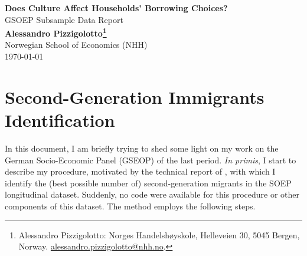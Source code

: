 \documentclass[12pt,a4paper]{article}
\makeatletter
\def\thanks#1{\footnote{#1}}
\newcommand{\Title}{Does Culture Affect Households' Borrowing Choices?}%
\newcommand{\wDocument}{GSOEP Subsample Data Report}%
\newcommand{\Name}{Alessandro Pizzigolotto}%
\newcommand{\AffiliationA}{Norwegian School of Economics (NHH)}%
\newcommand{\Address}{Norges Handelshøyskole, Helleveien 30, 5045 Bergen, Norway}%
\newcommand{\Email}{\href{mailto:alessandro.pizzigolotto@nhh.no}{alessandro.pizzigolotto@nhh.no}}%
\newcommand{\mydate}{\today}
\makeatother
\begin{document}

\begin{center}
    {\Large \bf {\textup{\Title}}}\\
    \vspace{0.2in}
    {\large \sc \wDocument}\\
    \vspace{0.2in}
    {\bf {\Name}\thanks{\Name: \Address. \Email.}}\\
    \AffiliationA\\
    \vspace{0.3in}
    \mydate %
    \vspace{0.3in}
\end{center}

\section{Second-Generation Immigrants Identification}

In this document, I am briefly trying to shed some light on my work on the German Socio-Economic Panel (GSEOP) of the last period. \textit{In primis}, I start to describe my procedure, motivated by the technical report of \citet{bib:scheller2011}, with which I identify the (best possible number of) second-generation migrants in the SOEP longitudinal dataset. Suddenly, no code were available for this procedure or other components of this dataset. The method employs the following steps.
\end{document}

